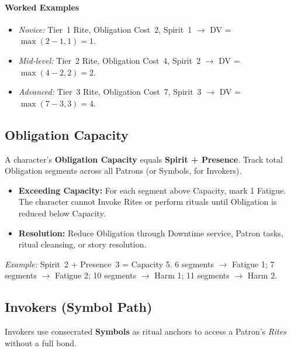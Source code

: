 \paragraph{Worked Examples}
\begin{itemize}
    \item \emph{Novice:} Tier~1 Rite, Obligation Cost~2, Spirit~1 $\rightarrow$ DV = $\max(2-1,1)=1$.
    \item \emph{Mid-level:} Tier~2 Rite, Obligation Cost~4, Spirit~2 $\rightarrow$ DV = $\max(4-2,2)=2$.
    \item \emph{Advanced:} Tier~3 Rite, Obligation Cost~7, Spirit~3 $\rightarrow$ DV = $\max(7-3,3)=4$.
\end{itemize}

\subsection{Obligation Capacity}\label{sec:obligation_capacity}

A character's \textbf{Obligation Capacity} equals \textbf{Spirit + Presence}. Track total Obligation segments across all Patrons (or Symbols, for Invokers).

\begin{itemize}
    \item \textbf{Exceeding Capacity:} For each segment above Capacity, mark 1 Fatigue. The character cannot Invoke Rites or perform rituals until Obligation is reduced below Capacity.
    \item \textbf{Resolution:} Reduce Obligation through Downtime service, Patron tasks, ritual cleansing, or story resolution.
\end{itemize}
\textit{Example:} Spirit~2 + Presence~3 = Capacity 5. 6 segments $\rightarrow$ Fatigue 1; 7 segments $\rightarrow$ Fatigue 2; 10 segments $\rightarrow$ Harm 1; 11 segments $\rightarrow$ Harm 2.

\subsection{Invokers (Symbol Path)}\label{subsec:invokers}

Invokers use consecrated \textbf{Symbols} as ritual anchors to access a Patron's \emph{Rites} without a full bond.


